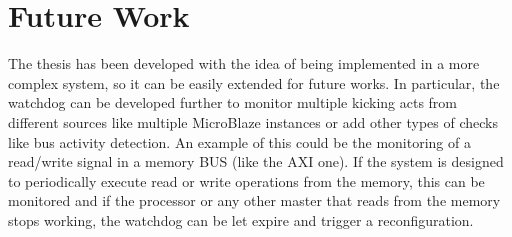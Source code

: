 








\section{Future Work}

The thesis has been developed with the idea of being implemented in a more complex system, so it can be easily extended for future works. In particular, the watchdog can be developed further to monitor multiple kicking acts from different sources like multiple MicroBlaze instances or add other types of checks like bus activity detection. An example of this could be the monitoring of a read/write signal in a memory BUS (like the AXI one). If the system is designed to periodically execute read or write operations from the memory, this can be monitored and if the processor or any other master that reads from the memory stops working, the watchdog can be let expire and trigger a reconfiguration. \bigskip

